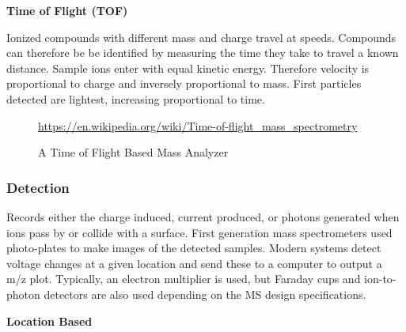 \documentclass[letterpaper, 10 pt, conference]{ieeeconf}  %
\begin{document}
            \FloatBarrier

            \textbf{Time of Flight (TOF)} \hfill

            Ionized compounds with different mass and charge travel at speeds. Compounds can therefore be be identified by measuring the time they take to travel a known distance. Sample ions enter with equal kinetic energy. Therefore velocity is proportional to charge and inversely proportional to mass. First particles detected are lightest, increasing proportional to time.

            \begin{figure}[H]
                \centering
            
                \caption{A Time of Flight Based Mass Analyzer}

                \tiny{\url{https://en.wikipedia.org/wiki/Time-of-flight_mass_spectrometry}}

            \end{figure}

            \FloatBarrier
        
        \subsubsection[\textbf{Detection}]{\textbf{Detection}\autocite{R9}} \hfill \hfill
        \vspace{5 pt}

        Records either the charge induced, current produced, or photons generated when ions pass by or collide with a surface. First generation mass spectrometers used photo-plates to make images of the detected samples. Modern systems detect voltage changes at a given location and send these to a computer to output a m/z plot. Typically, an electron multiplier is used, but Faraday cups and ion-to-photon detectors are also used depending on the MS design specifications.

        \vspace{5 pt}
            
            \textbf{Location Based}
\end{document}

